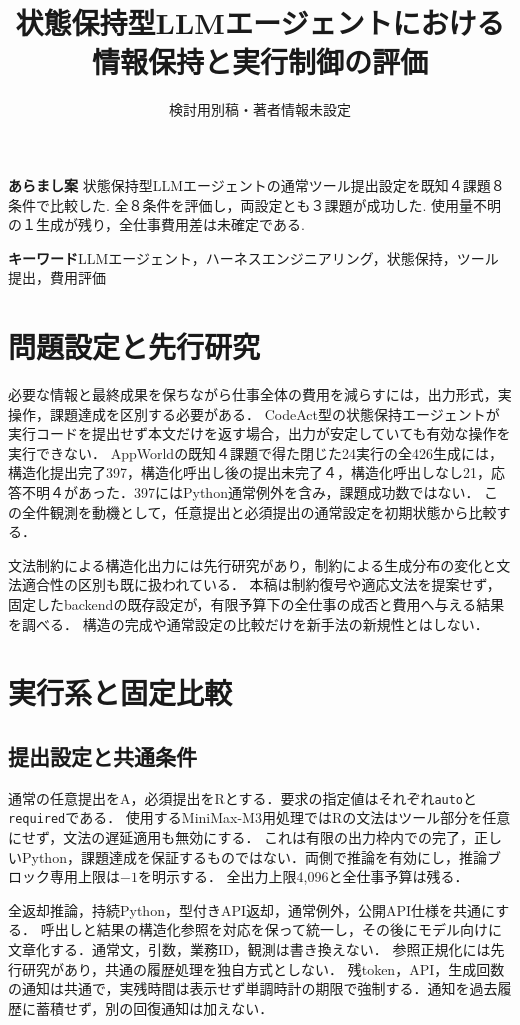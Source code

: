 \documentclass[uplatex,a4paper,twocolumn,10pt]{jsarticle}
\title{状態保持型LLMエージェントにおける\newline 情報保持と実行制御の評価}
\author{検討用別稿・著者情報未設定}
\date{}
\begin{document}
\raggedbottom
\maketitle
\noindent\textbf{あらまし案}\quad
状態保持型LLMエージェントの通常ツール提出設定を既知４課題８条件で比較した. 全８条件を評価し，両設定とも３課題が成功した. 使用量不明の１生成が残り，全仕事費用差は未確定である.

\noindent\textbf{キーワード}\quad LLMエージェント，ハーネスエンジニアリング，状態保持，ツール提出，費用評価

\section{問題設定と先行研究}
必要な情報と最終成果を保ちながら仕事全体の費用を減らすには，出力形式，実操作，課題達成を区別する必要がある．
CodeAct\cite{codeact}型の状態保持エージェントが実行コードを提出せず本文だけを返す場合，出力が安定していても有効な操作を実行できない．
AppWorld\cite{appworld}の既知４課題で得た閉じた24実行の全426生成には，構造化提出完了397，構造化呼出し後の提出未完了４，構造化呼出しなし21，応答不明４があった．397にはPython通常例外を含み，課題成功数ではない．
この全件観測を動機として，任意提出と必須提出の通常設定を初期状態から比較する．

文法制約による構造化出力\cite{gcd}には先行研究があり，制約による生成分布の変化と文法適合性の区別\cite{gad}も既に扱われている．
本稿は制約復号や適応文法を提案せず，固定したbackend\cite{backend}の既存設定が，有限予算下の全仕事の成否と費用へ与える結果を調べる．
構造の完成や通常設定の比較だけを新手法の新規性とはしない．

\section{実行系と固定比較}
\subsection{提出設定と共通条件}
通常の任意提出をA，必須提出をRとする．要求の指定値はそれぞれ\texttt{auto}と\texttt{required}である．
使用するMiniMax-M3用処理ではRの文法はツール部分を任意にせず，文法の遅延適用も無効にする．
これは有限の出力枠内での完了，正しいPython，課題達成を保証するものではない．両側で推論を有効にし，推論ブロック専用上限は$-1$を明示する．
全出力上限4,096と全仕事予算は残る．

全返却推論，持続Python，型付きAPI返却，通常例外，公開API仕様を共通にする．
呼出しと結果の構造化参照を対応を保って統一し，その後にモデル向けに文章化する．通常文，引数，業務ID，観測は書き換えない．
参照正規化には先行研究\cite{canonical}があり，共通の履歴処理を独自方式としない．
残token，API，生成回数の通知は共通で，実残時間は表示せず単調時計の期限で強制する．通知を過去履歴に蓄積せず，別の回復通知は加えない．
\end{document}

